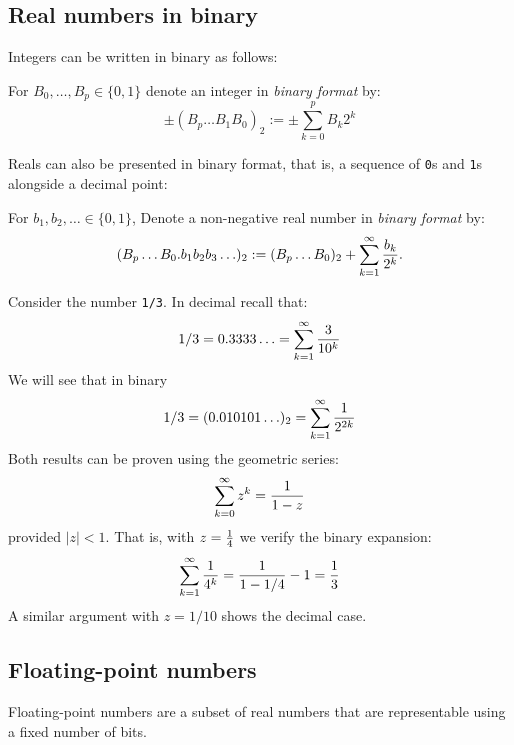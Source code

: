 \subsection{Real numbers in binary}
Integers can be written in binary as follows:

\begin{definition} For $B_0,\ldots,B_p \in \{0,1\}$ denote an integer in \emph{binary format} by:
\[
\ensuremath{\pm}(B_p\ldots B_1B_0)_2 := \ensuremath{\pm}\sum_{k=0}^p B_k 2^k
\]
\end{definition}

Reals can also be presented in binary format, that is, a sequence of \texttt{0}s and \texttt{1}s alongside a decimal point:

\begin{definition} For $b_1,b_2,\ensuremath{\ldots}\in \{0,1\}$, Denote a non-negative real number in \emph{binary format} by:
\[
(B_p \ensuremath{\ldots}B_0.b_1b_2b_3\ensuremath{\ldots})_2 := (B_p \ensuremath{\ldots}B_0)_2 +  \sum_{k=1}^\ensuremath{\infty} {b_k \over 2^k}.
\]
\end{definition}

\begin{example} Consider the number \texttt{1/3}.  In decimal recall that:
\[
1/3 = 0.3333\ensuremath{\ldots}=  \sum_{k=1}^\ensuremath{\infty} {3 \over 10^k}
\]
We will see that in binary
\[
1/3 = (0.010101\ensuremath{\ldots})_2 = \sum_{k=1}^\ensuremath{\infty} {1 \over 2^{2k}}
\]
Both results can be proven using the geometric series:
\[
\sum_{k=0}^\ensuremath{\infty} z^k = {1 \over 1 - z}
\]
provided $|z| < 1$. That is, with $z = {1 \over 4}$ we verify the binary expansion:
\[
\sum_{k=1}^\ensuremath{\infty} {1 \over 4^k} = {1 \over 1 - 1/4} - 1 = {1 \over 3}
\]
A similar argument with $z = 1/10$ shows the decimal case. \end{example}

\subsection{Floating-point numbers}
Floating-point numbers are a subset of real numbers that are representable using a fixed number of bits.

